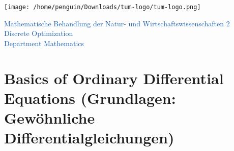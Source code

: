 \documentclass{article}
\begin{document}
\begin{flushright}
    \texttt{[image: /home/penguin/Downloads/tum-logo/tum-logo.png]} \\
\end{flushright}
\vspace{-1.5cm}
\noindent
\large 
\textcolor[HTML]{165DB1}{Mathematische Behandlung der Natur- und Wirtschaftswissenschaften 2
\\ Discrete Optimization \\ Department Mathematics}
\vspace{5mm}
\normalsize
\vspace{3mm}
\section{Basics of Ordinary Differential Equations (Grundlagen: Gewöhnliche Differentialgleichungen)}
\end{document}
